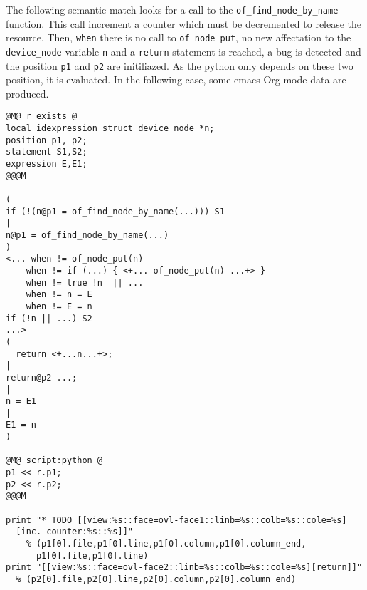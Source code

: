 The following semantic match looks for a call to the
\texttt{of\_find\_node\_by\_name} function. This call increment a
counter which must be decremented to release the resource. Then,
\texttt{when} there is no call to \texttt{of_node_put}, no new
affectation to the \texttt{device_node} variable \texttt{n} and a
\texttt{return} statement is reached, a bug is detected and the
position \texttt{p1} and \texttt{p2} are initiliazed. As the python
only depends on these two position, it is evaluated. In the following
case, some emacs Org mode data are produced.

\begin{lstlisting}[language=Cocci]
@M@ r exists @
local idexpression struct device_node *n;
position p1, p2;
statement S1,S2;
expression E,E1;
@@@M

(
if (!(n@p1 = of_find_node_by_name(...))) S1
|
n@p1 = of_find_node_by_name(...)
)
<... when != of_node_put(n)
    when != if (...) { <+... of_node_put(n) ...+> }
    when != true !n  || ...
    when != n = E
    when != E = n
if (!n || ...) S2
...>
(
  return <+...n...+>;
|
return@p2 ...;
|
n = E1
|
E1 = n
)

@M@ script:python @
p1 << r.p1;
p2 << r.p2;
@@@M

print "* TODO [[view:%s::face=ovl-face1::linb=%s::colb=%s::cole=%s]
  [inc. counter:%s::%s]]"
    % (p1[0].file,p1[0].line,p1[0].column,p1[0].column_end,
      p1[0].file,p1[0].line)
print "[[view:%s::face=ovl-face2::linb=%s::colb=%s::cole=%s][return]]"
  % (p2[0].file,p2[0].line,p2[0].column,p2[0].column_end)
\end{lstlisting}


